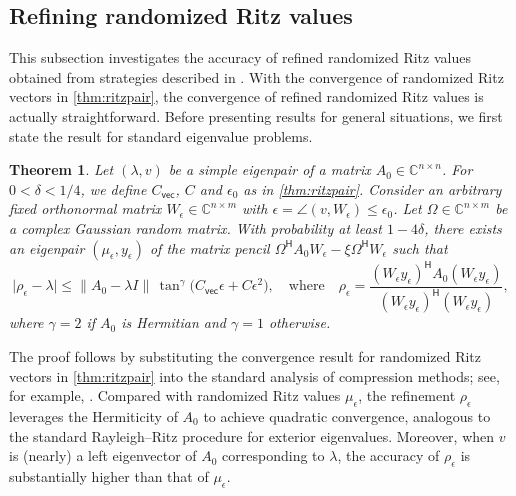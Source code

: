 \documentclass[a4paper,11pt]{article}
\newtheorem{theorem}{Theorem}
\newcommand{\Htran}{\mathsf{H}}
\newcommand{\C}{\mathbb{C}}
\newcommand{\Crvec}{C_{\mathsf{vec}}}
\providecommand{\abs}[1]{\lvert#1\rvert}
\providecommand{\norm}[1]{\lVert#1\rVert}
\begin{document}
\subsection{Refining randomized Ritz values}
\label{sec:refine}
This subsection investigates the accuracy of refined randomized Ritz values obtained from strategies described in .
With the convergence of randomized Ritz vectors in \cref{thm:ritzpair}, the convergence of refined randomized Ritz values is actually straightforward. 
Before presenting results for general situations, we first state the result for standard eigenvalue problems.

\begin{theorem}
Let $(\lambda,v)$ be a simple eigenpair of a matrix $A_{0}\in\C^{n\times n}$. For $0<\delta<1/4$, we define $\Crvec$, $C$ and $\epsilon_{0}$ as in \cref{thm:ritzpair}. 
Consider an arbitrary fixed orthonormal matrix $W_{\epsilon}\in\C^{n\times m}$ with $\epsilon=\angle(v,W_{\epsilon})\leq \epsilon_{0}$.
Let $\Omega\in\C^{n\times m}$ be a complex Gaussian random matrix. With probability at least $1-4\delta$, there exists an eigenpair $(\mu_{\epsilon},y_{\epsilon})$ of the matrix pencil $\Omega^{\Htran}A_{0}W_{\epsilon}-\xi \Omega^{\Htran}W_{\epsilon}$ such that
\begin{equation*}
    \abs{\rho_{\epsilon} - \lambda}
    \leq \norm{A_{0} - \lambda I}\,\tan^{\gamma} \bigl(\Crvec \epsilon+C\epsilon^{2}\bigr),\quad \text{where}\quad \rho_{\epsilon} = \frac{(W_{\epsilon}y_{\epsilon})^{\Htran}A_{0}(W_{\epsilon}y_{\epsilon})}{(W_{\epsilon}y_{\epsilon})^{\Htran}(W_{\epsilon}y_{\epsilon})},
\end{equation*}
where $\gamma = 2$ if $A_{0}$ is Hermitian and $\gamma = 1$ otherwise.

\end{theorem}

The proof follows by substituting the convergence result for randomized Ritz vectors in \cref{thm:ritzpair} into the standard analysis of compression methods; see, for example, \cite[Chap.~4.3]{Saad2011}.  
Compared with randomized Ritz values $\mu_{\epsilon}$, the refinement $\rho_{\epsilon}$ leverages the Hermiticity of $A_{0}$ to achieve quadratic convergence, analogous to the standard Rayleigh--Ritz procedure for exterior eigenvalues.  
Moreover, when $v$ is (nearly) a left eigenvector of $A_{0}$ corresponding to $\lambda$, the accuracy of $\rho_{\epsilon}$ is substantially higher than that of $\mu_{\epsilon}$.
\end{document}
